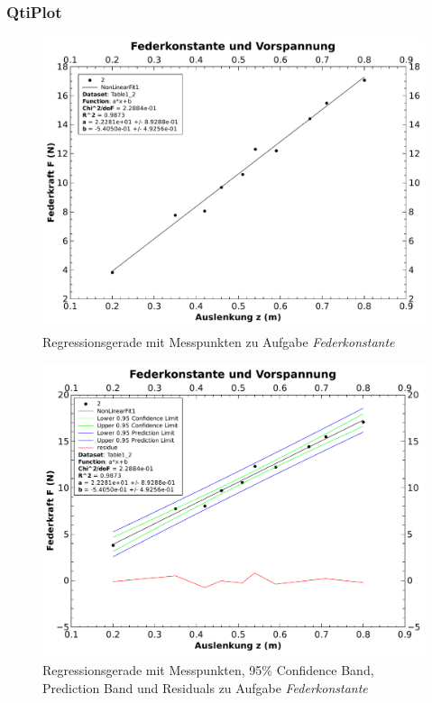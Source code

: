 \subsubsection{QtiPlot}
\begin{figure}[th!]
    \centering
    \includegraphics[width=.8\textwidth]{images/aufgabe3-1.pdf}
    \caption{Regressionsgerade mit Messpunkten zu Aufgabe \emph{Federkonstante}}
    \label{fig:gauss}
\end{figure}
\begin{figure}[th!]
    \centering
    \includegraphics[width=.8\textwidth]{images/aufgabe3-2.pdf}
    \caption{Regressionsgerade mit Messpunkten, 95\% Confidence Band, Prediction Band und Residuals zu Aufgabe \emph{Federkonstante}}
    \label{fig:gauss}
\end{figure}
